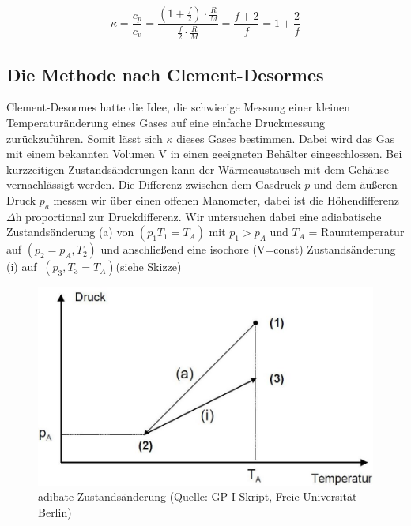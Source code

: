 \documentclass{article}
\begin{document}
{\begin{equation}
\label{18}
\kappa =\frac{c_{p}}{c_{v}}=\frac{\left(1+\frac{f}{2}\right)\cdot \frac{R}{M}}{\frac{f}{2}\cdot \frac{R}{M}}=\frac{f+2}{f}=1+\frac{2}{f}
\end{equation}

\subsection{Die Methode nach Clement-Desormes}
Clement-Desormes hatte die Idee, die schwierige Messung einer kleinen Temperaturänderung eines Gases auf eine einfache Druckmessung zurückzuführen. Somit lässt sich \(\kappa\) dieses Gases bestimmen.  
Dabei wird das Gas mit einem bekannten Volumen V in einen geeigneten Behälter eingeschlossen. Bei kurzzeitigen Zustandsänderungen kann der Wärmeaustausch mit dem Gehäuse vernachlässigt werden. Die Differenz zwischen dem Gasdruck \(p\) und dem äußeren Druck \(p_{a}\) messen wir über einen offenen Manometer, dabei ist die Höhendifferenz \(\Delta\)h proportional zur Druckdifferenz. Wir untersuchen dabei eine adiabatische Zustandsänderung (a) von \((p_{1} T_{1} = T_{A})\) mit \(p_{1} > p_{A}\) und \(T_{A}\) = Raumtemperatur auf \((p_{2} = p_{A}, T_{2})\) und anschließend eine isochore (V=const) Zustandsänderung (i) auf \(\ (p_{3}, T_{3}=T_{A})\)(siehe Skizze)

\begin{figure}[htbp]
\centering
\includegraphics[scale=0.3]{Bilder/ISE.jpg}
\begin{center}
\caption{adibate Zustandsänderung (Quelle: GP I Skript, Freie Universität Berlin)}
\end{center}
\end{figure}

}
\end{document}
